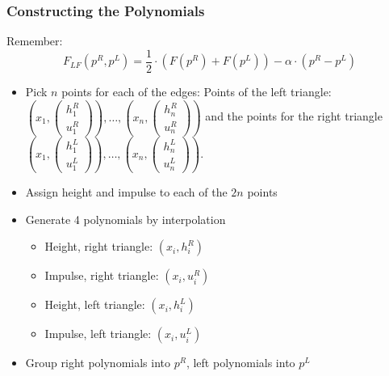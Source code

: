 \documentclass{beamer}
\begin{document}
\begin{frame}
  \frametitle{Constructing the Polynomials}
  Remember:
  \begin{equation*}
    F_{LF}(p^R,p^L) = \dfrac{1}{2}\cdot (F(p^R) + F(p^L)) - \alpha \cdot (p^R - p^L)
  \end{equation*}
  \begin{itemize}
  \item Pick $n$ points for each of the edges: 
    Points of the left triangle:
    $\left(x_1,\begin{pmatrix}
        h_1^R \\ u_1^R
      \end{pmatrix}\right), \dots , \left(x_n, \begin{pmatrix}
        h_n^R \\ u_n^R
      \end{pmatrix}\right)$ and the points for the right triangle 
    $\left(x_1,\begin{pmatrix}
        h_1^L \\ u_1^L
      \end{pmatrix}\right), \dots , \left(x_n,\begin{pmatrix}
        h_n^L \\ u_n^L
      \end{pmatrix}\right)$.
  \item Assign height and impulse to each of the $2n$ points
  \item Generate 4 polynomials by interpolation
    \begin{itemize}
    \item Height, right triangle: $(x_i, h_i^R)$
    \item Impulse, right triangle: $(x_i, u_i^R)$
    \item Height, left triangle: $(x_i, h_i^L)$
    \item Impulse, left triangle: $(x_i, u_i^L)$
    \end{itemize}
  \item Group right polynomials into $p^R$, left polynomials into $p^L$
  \end{itemize}
\end{frame}
\end{document}
